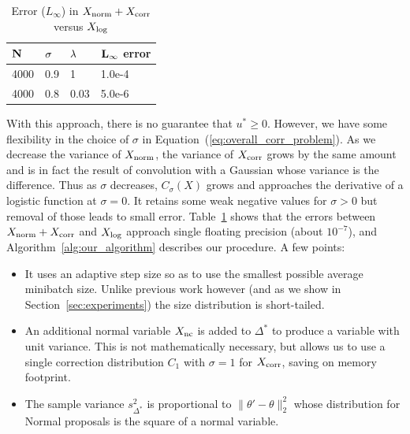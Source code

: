\documentclass[twoside]{article} \usepackage{aistats2017}
\begin{document}
\begin{table}[t]
    \caption{Error ($L_\infty$) in $X_{\rm norm}+X_{\rm corr}$ versus $X_{\rm log}$}
    \label{tab:xcorr}
    \centering
    \begin{tabular}{l l l l}
    ${\bf N}$ & ${\bf \sigma}$ & ${\bf \lambda}$ & ${\bf L_{\infty}}$ {\bf error} \\
    \hline
    4000 & 0.9 & 1 & 1.0e-4  \\
    4000 & 0.8 & 0.03 & 5.0e-6 \\
    \end{tabular}
\end{table}

With this approach, there is no guarantee that $u^* \geq 0$. However, we have
some flexibility in the choice of $\sigma$ in Equation~(\ref{eq:overall_corr_problem}).
As we decrease the variance of $X_{\rm norm}$, the variance of $X_{\rm corr}$
grows by the same amount and is in fact the result of convolution with a
Gaussian whose variance is the difference.  Thus as $\sigma$ decreases,
$C_\sigma(X)$ grows and approaches the derivative of a logistic function at
$\sigma = 0$. It retains some weak negative values for $\sigma > 0$ but removal
of those leads to small error. Table~\ref{tab:xcorr} shows that the errors
between $X_{\rm norm}+X_{\rm corr}$ and $X_{\rm log}$ approach single floating
precision (about $10^{-7}$), and Algorithm~\ref{alg:our_algorithm} describes our
procedure. A few points:

\begin{itemize}[noitemsep]
    \item It uses an adaptive step size so as to use the smallest possible
    average minibatch size. Unlike previous work however (and as we show in
    Section~\ref{sec:experiments}) the size distribution is short-tailed.

    \item An additional normal variable $X_{\rm nc}$ is added to $\Delta^*$ to
    produce a variable with unit variance. This is not mathematically necessary,
    but allows us to use a single correction distribution $C_1$ with $\sigma=1$
    for $X_{\rm corr}$, saving on memory footprint.

    \item The sample variance $s^2_{\Delta^*}$ is proportional to
    $\|\theta'-\theta\|_2^2$ whose distribution for Normal proposals is the
    square of a normal variable. 
\end{itemize}
\end{document}
